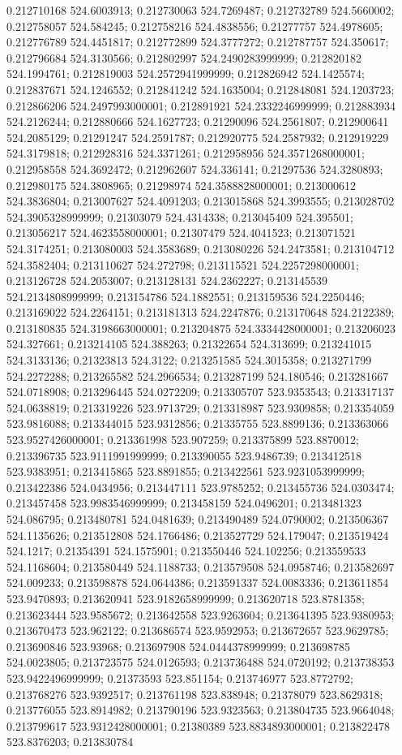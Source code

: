 0.212710168 524.6003913; 0.212730063 524.7269487; 0.212732789 524.5660002; 0.212758057 524.584245; 0.212758216 524.4838556; 0.21277757 524.4978605; 0.212776789 524.4451817; 0.212772899 524.3777272; 0.212787757 524.350617; 0.212796684 524.3130566; 0.212802997 524.2490283999999; 0.212820182 524.1994761; 0.212819003 524.2572941999999; 0.212826942 524.1425574; 0.212837671 524.1246552; 0.212841242 524.1635004; 0.212848081 524.1203723; 0.212866206 524.2497993000001; 0.212891921 524.2332246999999; 0.212883934 524.2126244; 0.212880666 524.1627723; 0.21290096 524.2561807; 0.212900641 524.2085129; 0.21291247 524.2591787; 0.212920775 524.2587932; 0.212919229 524.3179818; 0.212928316 524.3371261; 0.212958956 524.3571268000001; 0.212958558 524.3692472; 0.212962607 524.336141; 0.21297536 524.3280893; 0.212980175 524.3808965; 0.21298974 524.3588828000001; 0.213000612 524.3836804; 0.213007627 524.4091203; 0.213015868 524.3993555; 0.213028702 524.3905328999999; 0.21303079 524.4314338; 0.213045409 524.395501; 0.213056217 524.4623558000001; 0.21307479 524.4041523; 0.213071521 524.3174251; 0.213080003 524.3583689; 0.213080226 524.2473581; 0.213104712 524.3582404; 0.213110627 524.272798; 0.213115521 524.2257298000001; 0.213126728 524.2053007; 0.213128131 524.2362227; 0.213145539 524.2134808999999; 0.213154786 524.1882551; 0.213159536 524.2250446; 0.213169022 524.2264151; 0.213181313 524.2247876; 0.213170648 524.2122389; 0.213180835 524.3198663000001; 0.213204875 524.3334428000001; 0.213206023 524.327661; 0.213214105 524.388263; 0.21322654 524.313699; 0.213241015 524.3133136; 0.21323813 524.3122; 0.213251585 524.3015358; 0.213271799 524.2272288; 0.213265582 524.2966534; 0.213287199 524.180546; 0.213281667 524.0718908; 0.213296445 524.0272209; 0.213305707 523.9353543; 0.213317137 524.0638819; 0.213319226 523.9713729; 0.213318987 523.9309858; 0.213354059 523.9816088; 0.213344015 523.9312856; 0.21335755 523.8899136; 0.213363066 523.9527426000001; 0.213361998 523.907259; 0.213375899 523.8870012; 0.213396735 523.9111991999999; 0.213390055 523.9486739; 0.213412518 523.9383951; 0.213415865 523.8891855; 0.213422561 523.9231053999999; 0.213422386 524.0434956; 0.213447111 523.9785252; 0.213455736 524.0303474; 0.213457458 523.9983546999999; 0.213458159 524.0496201; 0.213481323 524.086795; 0.213480781 524.0481639; 0.213490489 524.0790002; 0.213506367 524.1135626; 0.213512808 524.1766486; 0.213527729 524.179047; 0.213519424 524.1217; 0.21354391 524.1575901; 0.213550446 524.102256; 0.213559533 524.1168604; 0.213580449 524.1188733; 0.213579508 524.0958746; 0.213582697 524.009233; 0.213598878 524.0644386; 0.213591337 524.0083336; 0.213611854 523.9470893; 0.213620941 523.9182658999999; 0.213620718 523.8781358; 0.213623444 523.9585672; 0.213642558 523.9263604; 0.213641395 523.9380953; 0.213670473 523.962122; 0.213686574 523.9592953; 0.213672657 523.9629785; 0.213690846 523.93968; 0.213697908 524.0444378999999; 0.213698785 524.0023805; 0.213723575 524.0126593; 0.213736488 524.0720192; 0.213738353 523.9422496999999; 0.21373593 523.851154; 0.213746977 523.8772792; 0.213768276 523.9392517; 0.213761198 523.838948; 0.21378079 523.8629318; 0.213776055 523.8914982; 0.213790196 523.9323563; 0.213804735 523.9664048; 0.213799617 523.9312428000001; 0.21380389 523.8834893000001; 0.213822478 523.8376203; 0.213830784 